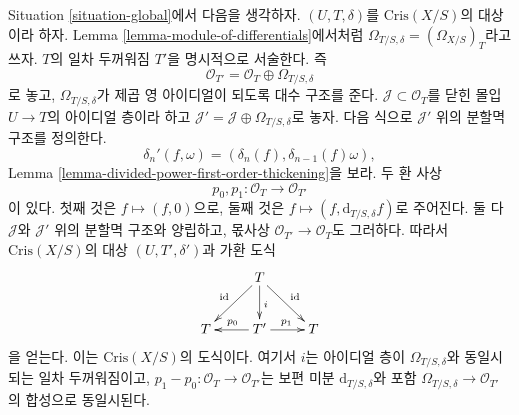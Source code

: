 \begin{remark}
\label{remark-first-order-thickening}
Situation \ref{situation-global}에서 다음을 생각하자.
$(U, T, \delta)$를 $\text{Cris}(X/S)$의 대상이라 하자.
Lemma \ref{lemma-module-of-differentials}에서처럼
$\Omega_{T/S, \delta} = (\Omega_{X/S})_T$라고 쓰자.
$T$의 일차 두꺼워짐 $T'$을 명시적으로 서술한다. 즉
$$
\mathcal{O}_{T'} = \mathcal{O}_T \oplus \Omega_{T/S, \delta}
$$
로 놓고, $\Omega_{T/S, \delta}$가 제곱 영 아이디얼이 되도록
대수 구조를 준다. $\mathcal{J} \subset \mathcal{O}_T$를 닫힌 몰입
$U \to T$의 아이디얼 층이라 하고
$\mathcal{J}' = \mathcal{J} \oplus \Omega_{T/S, \delta}$로 놓자.
다음 식으로 $\mathcal{J}'$ 위의 분할멱 구조를 정의한다.
$$
\delta_n'(f, \omega) = (\delta_n(f), \delta_{n - 1}(f)\omega),
$$
Lemma \ref{lemma-divided-power-first-order-thickening}을 보라.
두 환 사상
$$
p_0, p_1 : \mathcal{O}_T \to \mathcal{O}_{T'}
$$
이 있다. 첫째 것은 $f \mapsto (f, 0)$으로, 둘째 것은
$f \mapsto (f, \text{d}_{T/S, \delta}f)$로 주어진다.
둘 다 $\mathcal{J}$와 $\mathcal{J}'$ 위의 분할멱 구조와 양립하고,
몫사상 $\mathcal{O}_{T'} \to \mathcal{O}_T$도 그러하다.
따라서 $\text{Cris}(X/S)$의 대상 $(U, T', \delta')$과 가환 도식
$$
\xymatrix{
& T \ar[ld]_{\text{id}} \ar[d]^i \ar[rd]^{\text{id}} \\
T & T' \ar[l]_{p_0} \ar[r]^{p_1} & T
}
$$
을 얻는다. 이는 $\text{Cris}(X/S)$의 도식이다. 여기서 $i$는 아이디얼 층이
$\Omega_{T/S, \delta}$와 동일시되는 일차 두꺼워짐이고,
$p_1 - p_0 : \mathcal{O}_T \to \mathcal{O}_{T'}$는 보편 미분
$\text{d}_{T/S, \delta}$와 포함
$\Omega_{T/S, \delta} \to \mathcal{O}_{T'}$의 합성으로 동일시된다.
\end{remark}

